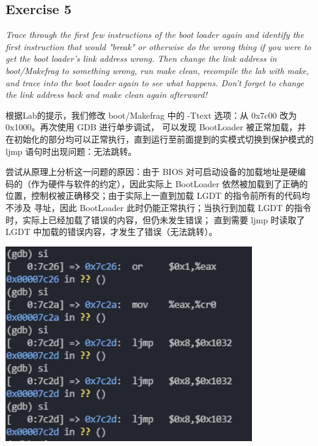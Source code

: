 \documentclass[12pt, letterpaper]{report}
\begin{document}
\subsection{Exercise 5}
\textsl{Trace through the first few instructions of the boot loader again 
        and identify the first instruction that would "break" or otherwise 
        do the wrong thing if you were to get the boot loader's link address wrong.
        Then change the link address in boot/Makefrag to something wrong, 
        run make clean, recompile the lab with make, and trace into the boot loader again 
        to see what happens. 
        Don't forget to change the link address back and make clean again afterward!} \par 
\quad \par 
根据Lab的提示，我们修改 boot/Makefrag 中的 -Ttext 选项：从 0x7c00 改为 0x1000。再次使用 GDB 进行单步调试，
可以发现 BootLoader 被正常加载，并在初始化的部分均可以正常执行，直到运行至前面提到的实模式切换到保护模式的
 ljmp 语句时出现问题：无法跳转。 \par
尝试从原理上分析这一问题的原因：由于 BIOS 对可启动设备的加载地址是硬编码的（作为硬件与软件的约定），因此实际上
 BootLoader 依然被加载到了正确的位置，控制权被正确移交；由于实际上一直到加载 LGDT 的指令前所有的代码均不涉及
寻址，因此 BootLoader 此时仍能正常执行；当执行到加载 LGDT 的指令时，实际上已经加载了错误的内容，但仍未发生错误；
直到需要 ljmp 时读取了 LGDT 中加载的错误内容，才发生了错误（无法跳转）。\par 
\quad \par 
\includegraphics[width=0.8\textwidth]{cantJmp}
\quad \par 
\end{document}
